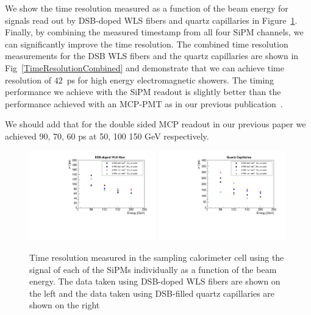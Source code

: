 We show the time resolution measured as a function of the beam energy for
signals read out by DSB-doped WLS fibers and quartz capillaries in
Figure~\ref{TimeResolutionVsEnergy}. Finally, by combining the measured
timestamp from all four SiPM channels, we can significantly improve the time
resolution. The combined time resolution measurements for the DSB WLS fibers and
the quartz capillaries are shown in Fig~\ref{TimeResolutionCombined} and
demonstrate that we can achieve time resolution of $42$~ps for high energy
electromagnetic showers. The timing performance we achieve with the SiPM readout
is slightly better than the performance achieved with an MCP-PMT as in our
previous publication~\cite{Anderson:2015gha}.

We should add that for the double sided MCP readout in our previous paper we achieved 90, 70, 60 ps at 50, 100 150 GeV  respectively. 


\begin{figure}[!htb]
\centering
\includegraphics[width=0.49\textwidth]{figures/ShashlikTimeResolutionVsEnergy_DSB.pdf}
\includegraphics[width=0.49\textwidth]{figures/ShashlikTimeResolutionVsEnergy_Capillaries.pdf}
\caption{\label{TimeResolutionVsEnergy} Time resolution measured in the sampling calorimeter 
cell using the signal of each of the SiPMs individually as a function of the beam energy. 
The data taken using DSB-doped WLS fibers are shown on
the left and the data taken using DSB-filled quartz capillaries are shown on the right}
\end{figure}



